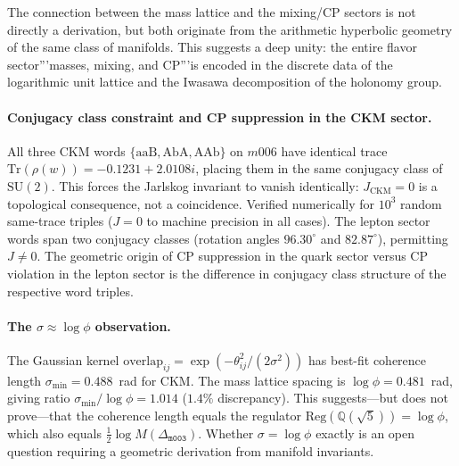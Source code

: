 \documentclass[12pt]{article}
\theoremstyle{definition}
\begin{document}
The connection between the mass lattice and the mixing/CP sectors is not directly a derivation, but both originate from the arithmetic hyperbolic geometry of the same class of manifolds. This suggests a deep unity: the entire flavor sector'''masses, mixing, and CP'''is encoded in the discrete data of the logarithmic unit lattice and the Iwasawa decomposition of the holonomy group.



\paragraph{Conjugacy class constraint and CP suppression in the CKM sector.}
All three CKM words $\{\mathrm{aaB},\mathrm{AbA},\mathrm{AAb}\}$ on $m006$
have identical trace $\mathrm{Tr}(\rho(w))=-0.1231+2.0108i$,
placing them in the same conjugacy class of $\mathrm{SU}(2)$.
This forces the Jarlskog invariant to vanish identically: $J_{\mathrm{CKM}}=0$
is a topological consequence, not a coincidence.
Verified numerically for $10^3$ random same-trace triples ($J=0$ to
machine precision in all cases).
The lepton sector words span two conjugacy classes
(rotation angles $96.30^\circ$ and $82.87^\circ$), permitting $J\neq0$.
The geometric origin of CP suppression in the quark sector versus
CP violation in the lepton sector is the difference in conjugacy class
structure of the respective word triples.

\paragraph{The $\sigma\approx\log\phi$ observation.}
The Gaussian kernel
$\mathrm{overlap}_{ij}=\exp(-\theta_{ij}^2/(2\sigma^2))$
has best-fit coherence length $\sigma_{\min}=0.488$~rad for CKM.
The mass lattice spacing is $\log\phi=0.481$~rad, giving ratio
$\sigma_{\min}/\log\phi=1.014$ ($1.4\%$ discrepancy).
This suggests---but does not prove---that the coherence length
equals the regulator $\mathrm{Reg}(\mathbb{Q}(\sqrt5))=\log\phi$,
which also equals $\tfrac{1}{2}\log M(\Delta_{\texttt{m003}})$.
Whether $\sigma=\log\phi$ exactly is an open question requiring
a geometric derivation from manifold invariants.
\end{document}
